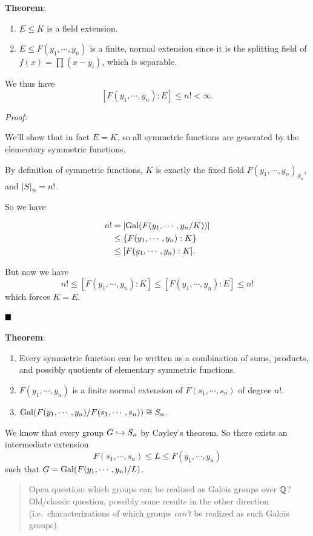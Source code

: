 \textbf{Theorem}:

\begin{enumerate}
\def\labelenumi{\arabic{enumi}.}
\item
  \(E \leq K\) is a field extension.
\item
  \(E \leq F(y_1, \cdots, y_n)\) is a finite, normal extension since it
  is the splitting field of \(f(x) = \prod (x-y_i)\), which is
  separable.
\end{enumerate}

We thus have \[
[F(y_1, \cdots, y_n): E] \leq n! < \infty
.\]

\emph{Proof:}

We'll show that in fact \(E = K\), so all symmetric functions are
generated by the elementary symmetric functions.

By definition of symmetric functions, \(K\) is exactly the fixed field
\(F(y_1, \cdots, y_n)_{S_n}\), and \({\left\lvert {S} \right\rvert}_n = n!\).

So we have

\begin{align*}
n! &= {\left\lvert { \mathrm{Gal}(F(y_1, \cdots, y_n / K))} \right\rvert} \\
& \leq \{F(y_1, \cdots, y_n) : K\} \\
& \leq [F(y_1, \cdots, y_n): K]
.\end{align*}

But now we have \[
n! \leq [F(y_1, \cdots, y_n):K] \leq [F(y_1, \cdots, y_n) : E] \leq n!
\] which forces \(K=E\).

\(\qed\)

\textbf{Theorem}:

\begin{enumerate}
\def\labelenumi{\arabic{enumi}.}
\item
  Every symmetric function can be written as a combination of sums,
  products, and possibly quotients of elementary symmetric functions.
\item
  \(F(y_1, \cdots, y_n)\) is a finite normal extension of
  \(F(s_1, \cdots, s_n)\) of degree \(n!\).
\item
  \(\mathrm{Gal}(F(y_1, \cdots, y_n) / F(s_1, \cdots, s_n)) \cong S_n\).
\end{enumerate}

We know that every group \(G \hookrightarrow S_n\) by Cayley's theorem. So
there exists an intermediate extension \[
F(s_1, \cdots, s_n) \leq L \leq F(y_1, \cdots, y_n)
\] such that \(G = \mathrm{Gal}(F(y_1, \cdots, y_n) / L)\).

\begin{quote}
Open question: which groups can be realized as Galois groups over
\({\mathbb{Q}}\)? Old/classic question, possibly some results in the other
direction (i.e.~characterizations of which groups \emph{can't} be
realized as such Galois groups).
\end{quote}

